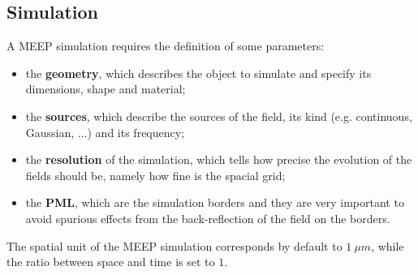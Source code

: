 \subsection{Simulation}

A MEEP simulation requires the definition of some parameters:
\begin{itemize}
    \item the \textbf{geometry}, which describes the object to simulate and specify its dimensions, shape and material;
    \item the \textbf{sources}, which describe the sources of the field, its kind (e.g. continuous, Gaussian, ...) and its frequency;
    \item the \textbf{resolution} of the simulation, which tells how precise the evolution of the fields should be, namely how fine is the spacial grid;
    \item the \textbf{PML}, which are the simulation borders and they are very important to avoid spurious effects from the back-reflection of the field on the borders.
\end{itemize}

The spatial unit of the MEEP simulation corresponds by default to \(1\ \mu m\), while the ratio between space and time is set to \(1\).